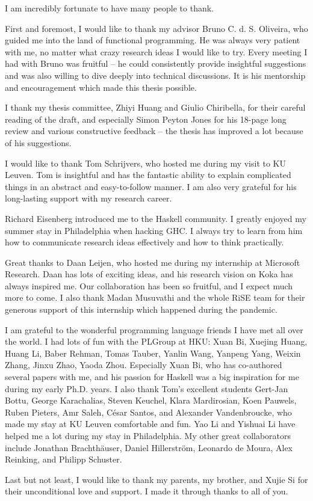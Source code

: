 I am incredibly fortunate to have many people to thank.

First and foremost, I would like to thank my advisor Bruno C. d. S. Oliveira,
who guided me into the land of functional programming. He was always very
patient with me, no matter what crazy research ideas I would like to try. Every
meeting I had with Bruno was fruitful -- he could consistently provide insightful
suggestions and was also willing to dive deeply into technical discussions. It
is his mentorship and encouragement which made this thesis possible.

I thank my thesis committee, Zhiyi Huang and Giulio Chiribella, for their careful
reading of the draft, and especially Simon Peyton Jones for his 18-page long
review and various constructive feedback -- the thesis has improved a lot
because of his suggestions.

I would like to thank Tom Schrijvers, who hosted me during my visit to KU
Leuven. Tom is insightful and has the fantastic ability to explain complicated
things in an abstract and easy-to-follow manner. I am also very grateful for his
long-lasting support with my research career.

Richard Eisenberg introduced me to the Haskell community. I greatly enjoyed my
summer stay in Philadelphia when hacking GHC. I always try to learn from him how
to communicate research ideas effectively and how to think practically.

Great thanks to Daan Leijen, who hosted me during my internship at Microsoft
Research. Daan has lots of exciting ideas, and his research vision on Koka has
always inspired me. Our collaboration has been so fruitful, and I expect much
more to come. I also thank Madan Musuvathi and the whole RiSE team for their
generous support of this internship which happened during the pandemic.

I am grateful to the wonderful programming language friends I have met all over
the world. I had lots of fun with the PLGroup at HKU: Xuan Bi, Xuejing Huang,
Huang Li, Baber Rehman, Tomas Tauber, Yanlin Wang, Yanpeng Yang, Weixin Zhang,
Jinxu Zhao, Yaoda Zhou. Especially Xuan Bi, who has co-authored several papers
with me, and his passion for Haskell was a big inspiration for me during my
early Ph.D. years. I also thank Tom's excellent students Gert-Jan Bottu, George
Karachalias, Steven Keuchel, Klara Mardirosian, Koen Pauwels, Ruben Pieters, Amr
Saleh, César Santos, and Alexander Vandenbroucke, who made my stay at KU Leuven
comfortable and fun. Yao Li and Yishuai Li have helped me a lot during my stay
in Philadelphia. My other great collaborators include Jonathan Brachthäuser,
Daniel Hillerström, Leonardo de Moura,  Alex Reinking, and Philipp Schuster.

Last but not least, I would like to thank my parents, my brother, and Xujie Si
for their unconditional love and support. I made it through thanks to all of
you.